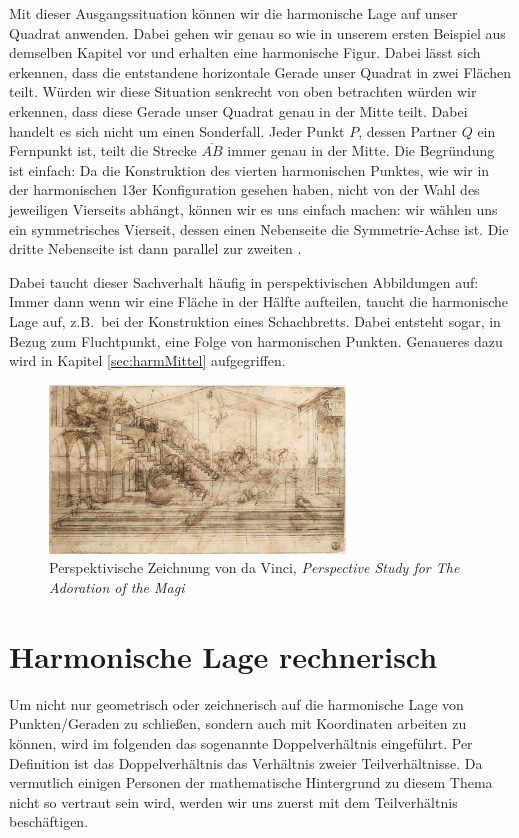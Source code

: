 \documentclass[12pt,a4paper]{article}
\begin{document}
Mit dieser Ausgangssituation können wir die harmonische Lage auf unser Quadrat anwenden. Dabei gehen wir genau so wie in unserem ersten Beispiel aus demselben Kapitel vor und erhalten eine harmonische Figur. Dabei lässt sich erkennen, dass die entstandene horizontale Gerade unser Quadrat in zwei Flächen teilt. Würden wir diese Situation senkrecht von oben betrachten würden wir erkennen, dass diese Gerade unser Quadrat genau in der Mitte teilt. Dabei handelt es sich nicht um einen Sonderfall. Jeder Punkt $P$, dessen Partner $Q$ ein Fernpunkt ist, teilt die Strecke $\overline{A B}$ immer genau in der Mitte.
\newline
Die Begründung ist einfach: Da die Konstruktion des vierten harmonischen Punktes, wie wir in der harmonischen 13er Konfiguration gesehen haben, nicht von der Wahl des jeweiligen Vierseits abhängt, können wir es uns einfach machen: wir wählen uns ein symmetrisches Vierseit, dessen einen Nebenseite die Symmetrie-Achse ist. Die dritte Nebenseite ist dann parallel zur zweiten \citep[vgl.~][S.~50]{projektiveGeometrie}.

Dabei taucht dieser Sachverhalt häufig in perspektivischen Abbildungen auf: Immer dann wenn wir eine Fläche in der Hälfte aufteilen, taucht die harmonische Lage auf, z.B.~bei der Konstruktion eines Schachbretts. Dabei entsteht sogar, in Bezug zum Fluchtpunkt, eine Folge von harmonischen Punkten. Genaueres dazu wird in Kapitel \ref{sec:harmMittel} aufgegriffen.

\begin{figure}[htbp]
\centering
\includegraphics[width=0.7\textwidth]{Bilder/daVinvi1.jpg}
\caption{Perspektivische Zeichnung von da Vinci, \textit{Perspective Study for The Adoration of the Magi}\protect\footnotemark[2]}
\end{figure}


\newpage
\section{Harmonische Lage rechnerisch}
Um nicht nur geometrisch oder zeichnerisch auf die harmonische Lage von Punkten/Geraden zu schließen, sondern auch mit Koordinaten arbeiten zu können, wird im folgenden das sogenannte Doppelverhältnis eingeführt. Per Definition ist das Doppelverhältnis das Verhältnis zweier Teilverhältnisse. Da vermutlich einigen Personen der mathematische Hintergrund zu diesem Thema nicht so vertraut sein wird, werden wir uns zuerst mit dem Teilverhältnis beschäftigen.
\end{document}
